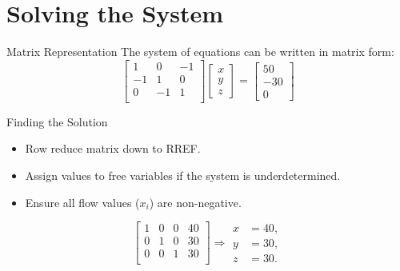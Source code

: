 \documentclass{beamer}
\begin{document}
\section{Solving the System}

\begin{frame}{Matrix Representation}
    The system of equations can be written in matrix form:
    \[
    \begin{bmatrix}
        1 & 0 & -1 \\
        -1 & 1 & 0 \\
        0 & -1 & 1 \\
    \end{bmatrix}
    \begin{bmatrix}
        x \\ y \\ z
    \end{bmatrix}
    =
    \begin{bmatrix}
        50 \\ -30 \\ 0
    \end{bmatrix}
    \]
    
\end{frame}

\begin{frame}{Finding the Solution}
    \begin{itemize}
        \item Row reduce matrix down to RREF.
        \item Assign values to free variables if the system is underdetermined.
        \item Ensure all flow values ($x_i$) are non-negative.
    \end{itemize}
    
    \[
    \begin{bmatrix}
        1 & 0 & 0 & 40 \\
        0 & 1 & 0 & 30 \\
        0 & 0 & 1 & 30 \\
    \end{bmatrix} \Rightarrow 
    \begin{aligned}
        x &= 40, \\
        y &= 30, \\
        z &= 30.
    \end{aligned}
    \] 
\end{frame}
\end{document}
